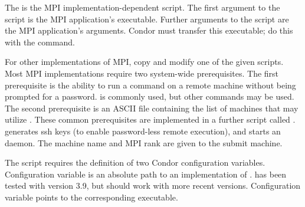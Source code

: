 The  is the MPI implementation-dependent script.
The first argument to the script is the MPI application's 
executable.
Further arguments to the script are the MPI application's arguments.
Condor must transfer this executable;
do this with the  command.

For other implementations of MPI,
copy and modify one of the given scripts.
Most MPI implementations require two system-wide prerequisites.
The first prerequisite is the ability to run a command
on a remote machine without being prompted for a password.
 is commonly used, but other
commands may be used.
The second prerequisite is an ASCII file containing the
list of machines that may utilize .
These common prerequisites are implemented in a further script
called .
 generates ssh keys 
(to enable password-less remote execution),
and starts an  daemon.
The machine name and MPI rank are given to the submit machine.


The  script requires the definition of
two Condor configuration variables.
Configuration variable  is an absolute path to
an implementation of .
 has been tested with  version 3.9,
but should work with more recent versions.
Configuration variable  points
to the corresponding  executable.


